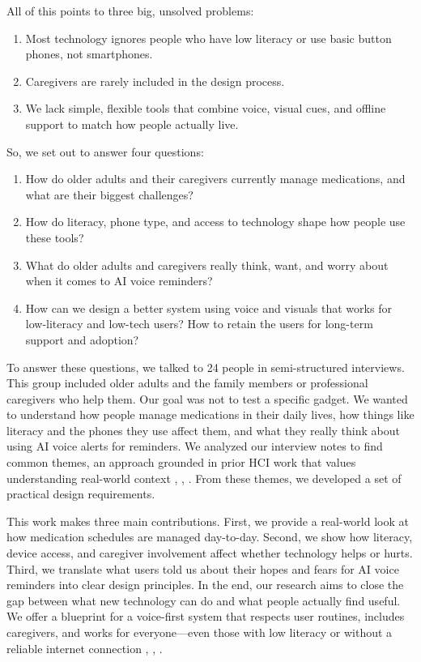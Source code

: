 \documentclass[acmlarge]{acmart}
\begin{document}
All of this points to three big, unsolved problems:

\begin{enumerate}
\def\labelenumi{\arabic{enumi}.}
\item
  Most technology ignores people who have low literacy or use basic
  button phones, not smartphones.
\item
  Caregivers are rarely included in the design process.
\item
  We lack simple, flexible tools that combine voice, visual cues, and
  offline support to match how people actually live.
\end{enumerate}

So, we set out to answer four questions:

\begin{enumerate}
\def\labelenumi{\arabic{enumi}.}
\item
  How do older adults and their caregivers currently manage medications,
  and what are their biggest challenges?
\item
  How do literacy, phone type, and access to technology shape how people
  use these tools?
\item
  What do older adults and caregivers really think, want, and worry
  about when it comes to AI voice reminders?
\item
  How can we design a better system using voice and visuals that works
  for low-literacy and low-tech users? How to retain the users for
  long-term support and adoption?
\end{enumerate}

To answer these questions, we talked to 24 people in semi-structured
interviews. This group included older adults and the family members or
professional caregivers who help them. Our goal was not to test a
specific gadget. We wanted to understand how people manage medications
in their daily lives, how things like literacy and the phones they use
affect them, and what they really think about using AI voice alerts for
reminders. We analyzed our interview notes to find common themes, an
approach grounded in prior HCI work that values understanding real-world
context \cite{Ahmad2022}, \cite{info:doi/10.2196/65269}, \cite{Bastani01122021}. From these themes, we developed a set of
practical design requirements.

This work makes three main contributions. First, we provide a real-world
look at how medication schedules are managed day-to-day. Second, we show
how literacy, device access, and caregiver involvement affect whether
technology helps or hurts. Third, we translate what users told us about
their hopes and fears for AI voice reminders into clear design
principles. In the end, our research aims to close the gap between what
new technology can do and what people actually find useful. We offer a
blueprint for a voice-first system that respects user routines, includes
caregivers, and works for everyone---even those with low literacy or
without a reliable internet connection \cite{10.1145/3623809.3623827}, \cite{10.1145/3706598.3713578}, \cite{10.1145/3700794.3700803}.
\end{document}
